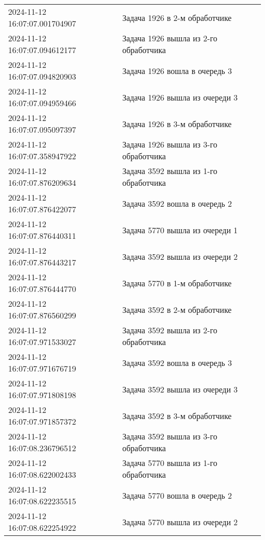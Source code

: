 \begin{table}[h]
\begin{center}
\begin{threeparttable}
\begin{tabular}{|l|l|}
                        2024-11-12 16:07:07.001704907 & Задача 1926 в 2-м обработчике\\
                        2024-11-12 16:07:07.094612177 & Задача 1926 вышла из 2-го обработчика\\
                        2024-11-12 16:07:07.094820903 & Задача 1926 вошла в очередь 3\\
                        2024-11-12 16:07:07.094959466 & Задача 1926 вышла из очереди 3\\
                        2024-11-12 16:07:07.095097397 & Задача 1926 в 3-м обработчике\\
                        2024-11-12 16:07:07.358947922 & Задача 1926 вышла из 3-го обработчика\\
                        2024-11-12 16:07:07.876209634 & Задача 3592 вышла из 1-го обработчика\\
                        2024-11-12 16:07:07.876422077 & Задача 3592 вошла в очередь 2\\
                        2024-11-12 16:07:07.876440311 & Задача 5770 вышла из очереди 1\\
                        2024-11-12 16:07:07.876443217 & Задача 3592 вышла из очереди 2\\
                        2024-11-12 16:07:07.876444770 & Задача 5770 в 1-м обработчике\\
                        2024-11-12 16:07:07.876560299 & Задача 3592 в 2-м обработчике\\
                        2024-11-12 16:07:07.971533027 & Задача 3592 вышла из 2-го обработчика\\
                        2024-11-12 16:07:07.971676719 & Задача 3592 вошла в очередь 3\\
                        2024-11-12 16:07:07.971808198 & Задача 3592 вышла из очереди 3\\
                        2024-11-12 16:07:07.971857372 & Задача 3592 в 3-м обработчике\\
                        2024-11-12 16:07:08.236796512 & Задача 3592 вышла из 3-го обработчика\\
                        2024-11-12 16:07:08.622002433 & Задача 5770 вышла из 1-го обработчика\\
                        2024-11-12 16:07:08.622235515 & Задача 5770 вошла в очередь 2\\
                        2024-11-12 16:07:08.622254922 & Задача 5770 вышла из очереди 2\\

\end{tabular}
\end{threeparttable}
\end{center}
\end{table}
